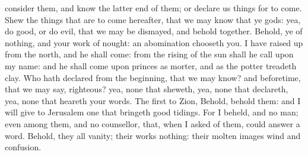 {consider them, and
know the latter
end of them; or
declare us things for to
come.
Shew the things that are to
come
hereafter, that we may
know that ye
{}
gods: yea, do
good, or do
evil, that we may be
dismayed, and
behold
{}
together.
Behold, ye
{} of
nothing, and your
work of
nought: an
abomination
{}
chooseth you.
I have raised
up
{} from the
north, and he shall
come: from the
rising of the
sun shall he
call upon my
name: and he shall
come upon
princes as
{}
morter, and as the
potter
treadeth
clay.
Who hath
declared from the
beginning, that we may
know? and
beforetime, that we may
say,
{}
righteous? yea,
{} none that
sheweth, yea,
{} none that
declareth, yea,
{} none that
heareth your
words.
The
first
{} to
Zion,
Behold,
behold them: and I will
give to
Jerusalem one that bringeth good
tidings.
For I
beheld, and
{} no
man; even among them, and
{} no
counsellor, that, when I
asked of them, could
answer a
word.
Behold, they
{} all
vanity; their
works
{}
nothing: their molten
images
{}
wind and
confusion.

}
